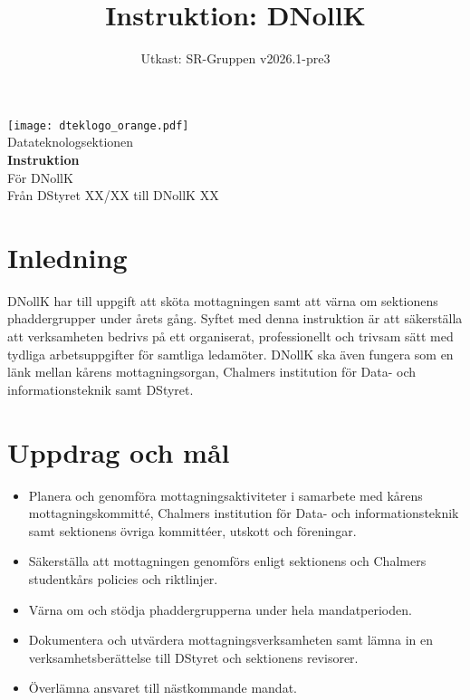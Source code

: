 \documentclass[a4paper]{dtekinstruktion}
\title{Instruktion: DNollK}
\date{Utkast: SR-Gruppen v2026.1-pre3}
\begin{document}
\begin{titlepage}
  \thispagestyle{empty} %
  \vspace*{1cm}
  \begin{center}
    \texttt{[image: dteklogo\_orange.pdf]}\\[3em]
    {\Huge Datateknologsektionen}\\[3em]
    {\Huge \textbf{Instruktion}}\\[1em]
    {\Huge För DNollK}\\[3em]
    Från DStyret XX/XX till DNollK XX
  \end{center}
\end{titlepage}

\makeheadfoot

\tableofcontents

\section{Inledning}
DNollK har till uppgift att sköta mottagningen samt att värna om sektionens phaddergrupper under årets gång. Syftet med denna instruktion är att säkerställa att verksamheten bedrivs på ett organiserat, professionellt och trivsam sätt med tydliga arbetsuppgifter för samtliga ledamöter. DNollK ska även fungera som en länk mellan kårens mottagningsorgan, Chalmers institution för Data- och informationsteknik samt DStyret.

\section{Uppdrag och mål}
\begin{itemize}
  \item Planera och genomföra mottagningsaktiviteter i samarbete med kårens mottagningskommitté, Chalmers institution för Data- och informationsteknik samt sektionens övriga kommittéer, utskott och föreningar.
  \item Säkerställa att mottagningen genomförs enligt sektionens och Chalmers studentkårs policies och riktlinjer.
  \item Värna om och stödja phaddergrupperna under hela mandatperioden.
  \item Dokumentera och utvärdera mottagningsverksamheten samt lämna in en verksamhetsberättelse till DStyret och sektionens revisorer.
  \item Överlämna ansvaret till nästkommande mandat.
\end{itemize}
\end{document}
